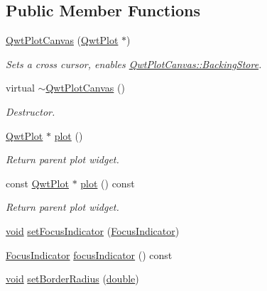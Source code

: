 \subsection*{Public Member Functions}
\begin{DoxyCompactItemize}
\item 
\hyperlink{class_qwt_plot_canvas_ae708ed2bc2fe614a809b9b70c9e8959e}{Qwt\-Plot\-Canvas} (\hyperlink{class_qwt_plot}{Qwt\-Plot} $\ast$)
\begin{DoxyCompactList}\small\item\em Sets a cross cursor, enables \hyperlink{class_qwt_plot_canvas_a76066290edb594a71ee09be564563b0fa7b88a46e1414f6d904aa494c89d064f3}{Qwt\-Plot\-Canvas\-::\-Backing\-Store}. \end{DoxyCompactList}\item 
virtual \hyperlink{class_qwt_plot_canvas_a320320bbb1b511c0c37fb2452a7f4404}{$\sim$\-Qwt\-Plot\-Canvas} ()
\begin{DoxyCompactList}\small\item\em Destructor. \end{DoxyCompactList}\item 
\hyperlink{class_qwt_plot}{Qwt\-Plot} $\ast$ \hyperlink{class_qwt_plot_canvas_a1b720b99dc1b686f58e789b13f339f63}{plot} ()
\begin{DoxyCompactList}\small\item\em Return parent plot widget. \end{DoxyCompactList}\item 
const \hyperlink{class_qwt_plot}{Qwt\-Plot} $\ast$ \hyperlink{class_qwt_plot_canvas_a72550d1af1b5fb4caca5269c3d5891f9}{plot} () const 
\begin{DoxyCompactList}\small\item\em Return parent plot widget. \end{DoxyCompactList}\item 
\hyperlink{group___u_a_v_objects_plugin_ga444cf2ff3f0ecbe028adce838d373f5c}{void} \hyperlink{class_qwt_plot_canvas_ae7330616dbb97128d01c5446ef0b006e}{set\-Focus\-Indicator} (\hyperlink{class_qwt_plot_canvas_a89b44e4c28038a674ce211fe9ac2d7be}{Focus\-Indicator})
\item 
\hyperlink{class_qwt_plot_canvas_a89b44e4c28038a674ce211fe9ac2d7be}{Focus\-Indicator} \hyperlink{class_qwt_plot_canvas_a0e9653bdf8c62299dbc3551ac7e5ec51}{focus\-Indicator} () const 
\item 
\hyperlink{group___u_a_v_objects_plugin_ga444cf2ff3f0ecbe028adce838d373f5c}{void} \hyperlink{class_qwt_plot_canvas_a1e5c325697c0e892bf0e4e514d50177c}{set\-Border\-Radius} (\hyperlink{_super_l_u_support_8h_a8956b2b9f49bf918deed98379d159ca7}{double})

\end{DoxyCompactItemize}
